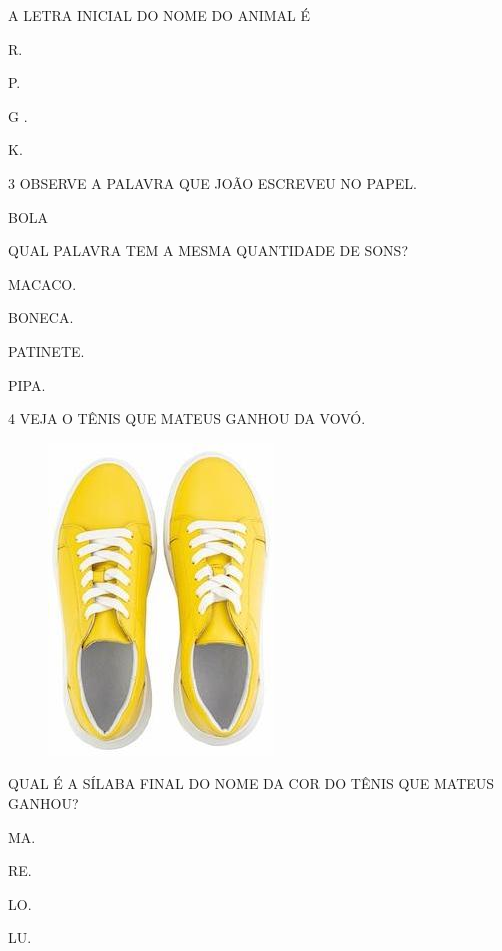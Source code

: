 A LETRA INICIAL DO NOME DO ANIMAL É 

\begin{escolha}
\item R.

\item P.

\item G .

\item K.
\end{escolha}

\num{3} OBSERVE A PALAVRA QUE JOÃO ESCREVEU NO PAPEL.

\begin{myquote}
BOLA
\end{myquote}

QUAL PALAVRA TEM A MESMA QUANTIDADE DE SONS? 

\begin{escolha}
\item MACACO.

\item BONECA.

\item PATINETE.

\item PIPA.
\end{escolha}

\pagebreak
\num{4} VEJA O TÊNIS QUE MATEUS GANHOU DA VOVÓ. 

\begin{figure}[htpb!]
\centering
\includegraphics[width=.2\textwidth]{media/image189.jpg}
\end{figure}

QUAL É A SÍLABA FINAL DO NOME DA COR DO TÊNIS QUE MATEUS GANHOU?

\begin{escolha}
\item MA.

\item RE.

\item LO.

\item LU.
\end{escolha}

